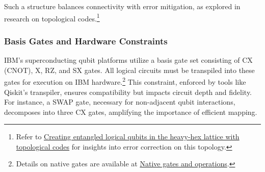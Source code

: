 \noindent
Such a structure balances connectivity with error mitigation, as explored in
research on topological codes.\footnote{Refer to \href{https://arxiv.org/abs/2404.15989}
{Creating entangled logical qubits in the heavy-hex lattice with topological
codes} for insights into error correction on this topology.}

\subsubsection*{Basis Gates and Hardware Constraints}

IBM's superconducting qubit platforms utilize a basis gate set consisting of
CX (CNOT), X, RZ, and SX gates. All logical circuits must be transpiled into
these gates for execution on IBM hardware.\footnote{Details on native gates
are available at \href{https://docs.quantum.ibm.com/guides/native-gates}{Native
gates and operations}.} This constraint, enforced by tools like Qiskit’s
transpiler, ensures compatibility but impacts circuit depth and fidelity. For
instance, a SWAP gate, necessary for non-adjacent qubit interactions,
decomposes into three CX gates, amplifying the importance of efficient mapping.

